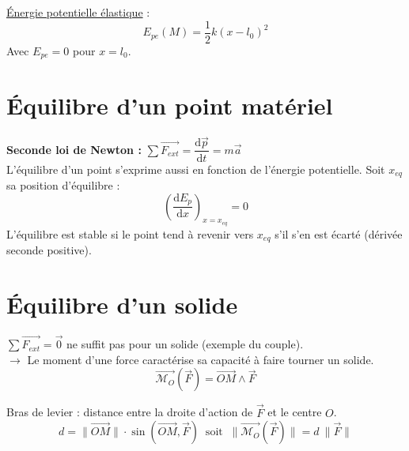 \documentclass[13pt, twoside, a4paper, french]{report}
\begin{document}
            \underline{Énergie potentielle élastique} : \[\displaystyle E_{pe}(M) = \dfrac{1}{2} k (x - l_0)^2\]
            Avec $E_{pe} = 0$ pour $x = l_0$.


        \section{Équilibre d'un point matériel}\label{sec:equilibre-d'un-point-materiel}

            \textbf{Seconde loi de Newton : } $\sum \overrightarrow{F_{ext}} = \dfrac{\textrm{d}\vec{p}}{\textrm{d}t} = m \vec{a}$\\
            L'équilibre d'un point s'exprime aussi en fonction de l'énergie potentielle.
            Soit $x_{eq}$ sa position d'équilibre :
            \[ \left( \dfrac{\textrm{d}E_p}{\textrm{d}x}\right) _{x=x_{eq}} = 0\]
            L'équilibre est stable si le point tend à revenir vers $x_{eq}$ s'il s'en est écarté (dérivée seconde positive).


        \section{Équilibre d'un solide}\label{sec:equilibre-d-un-solide}

            $\sum \overrightarrow{F_{ext}} = \vec{0}$ ne suffit pas pour un solide (exemple du couple).\\
            $\rightarrow$ Le moment d'une force caractérise sa capacité à faire tourner un solide.
            \[ \overrightarrow{\mathcal{M}_O}(\overrightarrow{F}) = \overrightarrow{OM} \land \overrightarrow{F} \]

            Bras de levier : distance entre la droite d'action de $\overrightarrow{F}$ et le centre $O$.
            \[ d = \|\overrightarrow{OM}\| \cdot \sin(\overrightarrow{OM}, \overrightarrow{F}) \;\; \text{soit} \;\; \|\overrightarrow{\mathcal{M}_O}(\overrightarrow{F})\| = d\ \|\overrightarrow{F}\| \]
\end{document}
